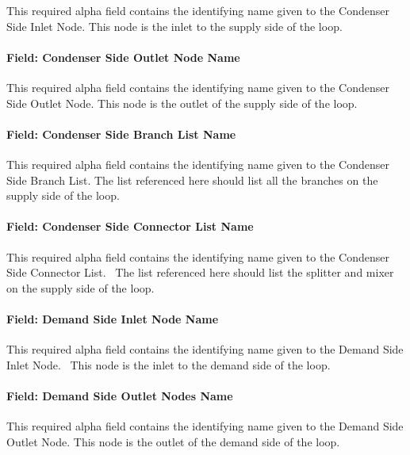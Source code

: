 This required alpha field contains the identifying name given to the Condenser Side Inlet Node. This node is the inlet to the supply side of the loop.

\paragraph{Field: Condenser Side Outlet Node Name}\label{field-condenser-side-outlet-node-name}

This required alpha field contains the identifying name given to the Condenser Side Outlet Node. This node is the outlet of the supply side of the loop.

\paragraph{Field: Condenser Side Branch List Name}\label{field-condenser-side-branch-list-name}

This required alpha field contains the identifying name given to the Condenser Side Branch List. The list referenced here should list all the branches on the supply side of the loop.

\paragraph{Field: Condenser Side Connector List Name}\label{field-condenser-side-connector-list-name}

This required alpha field contains the identifying name given to the Condenser Side Connector List.~ The list referenced here should list the splitter and mixer on the supply side of the loop.

\paragraph{Field: Demand Side Inlet Node Name}\label{field-demand-side-inlet-node-name-1}

This required alpha field contains the identifying name given to the Demand Side Inlet Node.~ This node is the inlet to the demand side of the loop.

\paragraph{Field: Demand Side Outlet Nodes Name}\label{field-demand-side-outlet-nodes-name}

This required alpha field contains the identifying name given to the Demand Side Outlet Node. This node is the outlet of the demand side of the loop.

